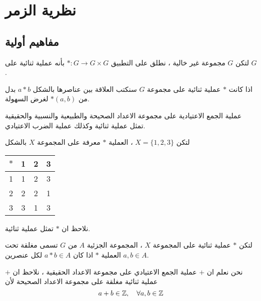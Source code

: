 \chapter{نظرية الزمر}

\section{مفاهيم أولية}

\begin{definition}
	لتكن $G$ مجموعة غير خالية ، نطلق على التطبيق $*:G\to G\times G$ بأنه عملية ثنائية على $G$.
\end{definition}

\begin{note}
	اذا كانت $*$ عملية ثنائية على مجموعة $G$ سنكتب العلاقة بين عناصرها بالشكل $a*b$ بدل من $*(a, b)$ لغرض السهولة.
\end{note}

\begin{example}
عملية الجمع الاعتيادية على مجموعة الاعداد الصحيحة والطبيعية والنسبية والحقيقية تمثل عملية ثنائية وكذلك عملية الضرب الاعتيادي. 
\end{example}

\begin{example}
	لتكن $X = \{1,2,3\}$ ، العملية $*$ معرفة على المجموعة $X$ بالشكل
	\begin{table}[H]
		\renewcommand{\arraystretch}{1.4}
		\centering
		\setLR
		\begin{tabular}{|c|c|c|c|}
			\hline
			$*$ & 1&2&3\\
			\hline
			1&1&2&3\\
			\hline
			2&2&2&1\\
			\hline
			3&3&1&3\\
			\hline
		\end{tabular}
	\end{table}
	\setRL\noindent
	نلاحظ ان $*$ تمثل عملية ثنائية.
\end{example}

\begin{definition}[( الانغلاق )]
	لتكن $*$ عملية ثنائية على المجموعة $X$ ، المجموعة الجزئية $A$ من $G$ تسمى مغلقة تحت العملية $*$ اذا كان $a*b \in A$ لكل عنصرين $a, b\in A$.
\end{definition}

\begin{example}
	نحن نعلم ان $+$ عملية الجمع الاعتيادي على مجموعة الاعداد الحقيقية ، نلاحظ ان $+$ عملية ثنائية مغلقة على مجموعة الاعداد الصحيحة لأن
	\[
	a+b \in \mathbb{Z} ,\quad \forall a, b\in \mathbb{Z}
	\]
\end{example}

